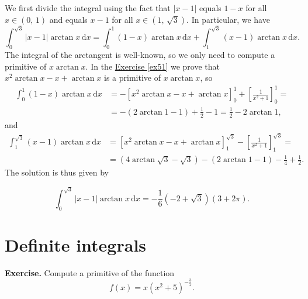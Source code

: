 \documentclass[a4paper,10 pt]{report}
\newcommand{\finalanswer}[1]{%
    \begin{finalAnswer}
    \[
        #1
    \]
    \end{finalAnswer}
}
\theoremstyle{definition}
\begin{document}
\begin{solutionBox} We first divide the integral using the fact that $|x - 1|$ equals $1-x$ for all $x \in (0, \, 1)$ and equals $x-1$ for all $x \in (1, \, \sqrt{3})$. In particular, we have
\begin{equation*} \int_0^{\sqrt{3}} |x - 1| \arctan x \, \mathrm{d}x = \int_0^1 (1-x) \arctan x \, \mathrm{d}x + \int_1^{\sqrt{3}} (x-1) \arctan x \, \mathrm{d}x.\end{equation*}
The integral of the arctangent is well-known, so we only need to compute a primitive of $x \arctan x$. In the \hyperref[ex51]{Exercise \ref{ex51}} we prove that $x^2 \arctan x - x + \arctan x$ is a primitive of $x \arctan x$, so
\begin{equation*} \begin{aligned}  \int_0^1 (1-x) \arctan x \, \mathrm{d}x & = - \left[x^2 \arctan x - x + \arctan x \right]_0^1 + \left[ \frac{1}{x^2 + 1} \right]_{0}^1 =
\\[1em]  & = -(2 \arctan 1 - 1) + \frac{1}{2} - 1 =  \frac{1}{2} - 2 \arctan 1 , \end{aligned} \end{equation*}
and
\begin{equation*} \begin{aligned}  \int_1^{\sqrt{3}} (x - 1) \arctan x \, \mathrm{d}x & = \left[x^2 \arctan x - x + \arctan x \right]_1^{\sqrt{3}} - \left[ \frac{1}{x^2 + 1} \right]_1^{\sqrt{3}} =
\\[1em]  & = (4 \arctan \sqrt{3} - \sqrt{3}) - (2 \arctan 1 - 1) - \frac{1}{4} + \frac{1}{2}. \end{aligned} \end{equation*}
The solution is thus given by
\finalanswer{
\int_0^{\sqrt{3}} |x - 1| \arctan x \, \mathrm{d}x = -\frac{1}{6}(-2 + \sqrt{3}) (3 + 2 \pi).
}\end{solutionBox}

\chapter{Definite integrals}

\begin{exerciseBox} \textbf{Exercise.}  Compute a primitive of the function
\begin{equation*} f(x) = x (x^2 + 5)^{- \frac{3}{2}}. \end{equation*} \end{exerciseBox}
\end{document}
